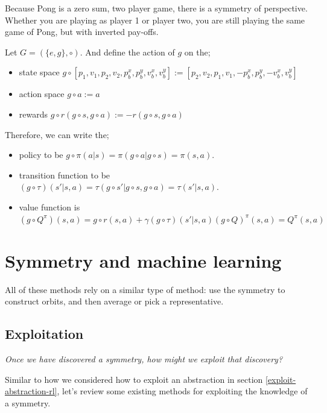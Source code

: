Because Pong is a zero sum, two player game, there is a symmetry of perspective.
Whether you are playing as player 1 or player two, you are still playing the same game of Pong,
but with inverted pay-offs.

Let $G = (\{e, g\}, \circ)$. And define the action of $g$ on the;

\begin{itemize}
	\tightlist
	\item state space $g \circ [p_1, v_1, p_2, v_2, p^x_b, p^y_b, v^x_b, v^y_b] := [p_2, v_2, p_1, v_1, -p^x_b, p^y_b, -v^x_b, v^y_b]$
	\item action space $g \circ a := a$
  \item rewards $g \circ r(g \circ s, g \circ a) := -r(g \circ s, g \circ a)$
\end{itemize}

Therefore, we can write the;
\begin{itemize}
  \tightlist
 	\item policy to be $g \circ \pi(a | s) = \pi(g \circ a | g \circ s) = \pi(s, a)$.
	\item transition function to be $(g \circ \tau)(s' | s, a) = \tau(g \circ s'| g \circ s, g \circ a) = \tau(s' | s, a)$.
	\item value function is $(g \circ Q^{\pi})(s, a) = g \circ r(s, a)+ \gamma (g \circ \tau)(s'|s, a) (g \circ Q)^{\pi}(s, a) = Q^{\pi}(s, a)$
\end{itemize}

\section{Symmetry and machine learning}

All of these methods rely on a similar type of method: use the symmetry to construct orbits, and then average or pick a representative.

\subsection{Exploitation} \label{symmetric-exploitation}

\begin{displayquote}
\textsl{Once we have discovered a symmetry, how might we exploit that discovery?}
\end{displayquote}

Similar to how we considered how to exploit an abstraction in section \ref{exploit-abstraction-rl},
let's review some existing methods for exploiting the knowledge of a symmetry.

